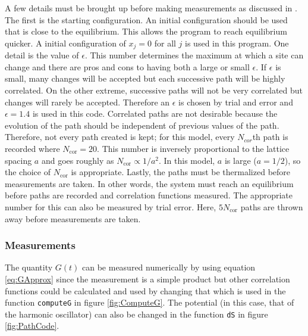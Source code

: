 \documentclass[11pt]{article}
\begin{document}
A few details must be brought up before making measurements as discussed in \cite{MainPaper}. The first is the starting configuration. An initial configuration should be used that is close to the equilibrium. This allows the program to reach equilibrium quicker. A initial configuration of $x_j=0$ for all $j$ is used in this program. One detail is the value of $\epsilon$. This number determines the maximum at which a site can change and there are pros and cons to having both a large or small $\epsilon$. If $\epsilon$ is small, many changes will be accepted but each successive path will be highly correlated. On the other extreme, successive paths will not be very correlated but changes will rarely be accepted. Therefore an $\epsilon$ is chosen by trial and error and $\epsilon=1.4$ is used in this code. Correlated paths are not desirable because the evolution of the path should be independent of previous values of the path. Therefore, not every path created is kept; for this model, every $N_{cor}$th path is recorded where $N_{\text{cor}}=20$. This number is inversely proportional to the lattice spacing $a$ and goes roughly as $N_{\text{cor}}\propto 1/a^2$. In this model, $a$ is large ($a=1/2$), so the choice of $N_{\text{cor}}$ is appropriate. Lastly, the paths must be thermalized before measurements are taken. In other words, the system must reach an equilibrium before paths are recorded and correlation functions measured. The appropriate number for this can also be measured by trial error. Here, $5N_{\text{cor}}$ paths are thrown away before measurements are taken.

\subsubsection{Measurements}
The quantity $G(t)$ can be measured numerically by using equation \ref{eq:GApprox} since the measurement is a simple product but other correlation functions could be calculated  and used by changing that which is used in the function \texttt{computeG} in figure \ref{fig:ComputeG}. The potential (in this case, that of the harmonic oscillator) can also be changed in the function \texttt{dS} in figure \ref{fig:PathCode}.
\end{document}
